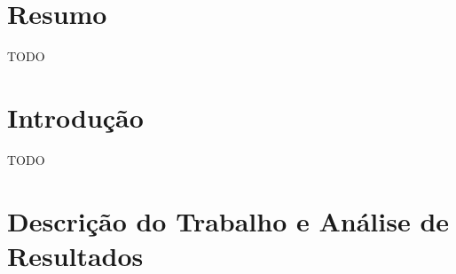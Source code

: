 \documentclass{article}
\begin{document}
\section{Resumo}
{\color{red}TODO}
\vspace*{\fill}

\newpage

\vspace*{\fill}
\tableofcontents
\vspace*{\fill}

\newpage

\vspace*{\fill}
\section{Introdução}
{\color{red}TODO}
\vspace*{\fill}

\newpage

\section{Descrição do Trabalho e Análise de Resultados}
\end{document}
